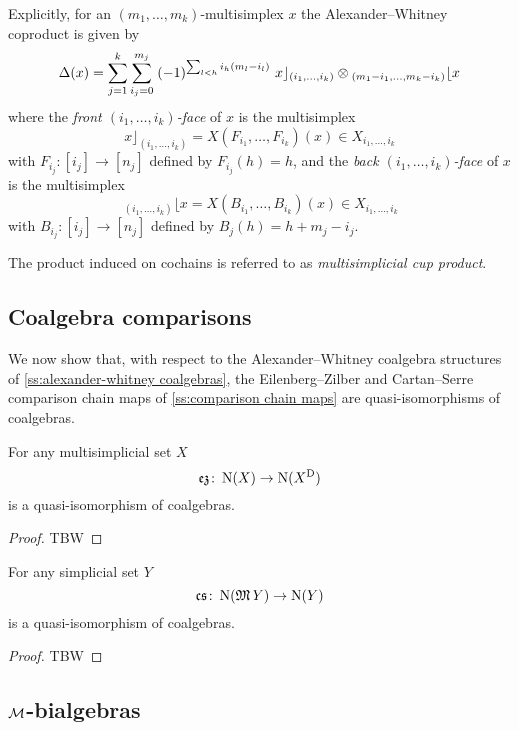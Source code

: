 Explicitly, for an $(m_1, \dots, m_k)$-multisimplex $x$ the Alexander--Whitney coproduct is given by
\[
\operatorname{\Delta}(x) =
\sum_{j=1}^k \sum_{i_{j}=0}^{m_{j}} \;
(-1)^{\sum_{l<h} i_h (m_l-i_l) } \
x \rfloor_{(i_{1},\dots,i_{k})} \otimes
\!\,_{(m_{1}-i_{1}, \dots, m_{k}-i_{k})} \lfloor x
\]
where the \textit{front $(i_1, \dots, i_k)$-face} of $x$ is the multisimplex
\[
x \rfloor_{(i_{1}, \dots, i_{k})} =
X(F_{i_1}, \dots, F_{i_k})(x) \in X_{i_1, \dots, i_k}
\]
with
$F_{i_j} \colon [i_j] \to [n_j]$ defined by $F_{i_j}(h)=h$, and the \textit{back $(i_1, \dots, i_k)$-face} of $x$ is the multisimplex
\[
\,_{(i_{1}, \dots, i_{k})} \lfloor x =
X(B_{i_1}, \dots, B_{i_k})(x) \in X_{i_1, \dots, i_k}
\]
with $B_{i_j} \colon [i_j] \to [n_j]$ defined by $B_j(h) = h+m_j-i_j$.

The product induced on cochains is referred to as \textit{multisimplicial cup product}.

\subsection{Coalgebra comparisons}

We now show that, with respect to the Alexander--Whitney coalgebra structures of \cref{ss:alexander-whitney coalgebras}, the Eilenberg--Zilber and Cartan--Serre comparison chain maps of \cref{ss:comparison chain maps} are quasi-isomorphisms of coalgebras.

\begin{theorem}
	For any multisimplicial set $X$
	\[
	\operatorname{\mathfrak{ez}} \colon \operatorname{N}(X) \to \operatorname{N}(X^{\mathrm{D}})
	\]
	is a quasi-isomorphism of coalgebras.
\end{theorem}

\begin{proof}
	TBW 
\end{proof}

\begin{theorem}
	For any simplicial set $Y$
	\[
	\operatorname{\mathfrak{cs}} \colon \operatorname{N}(\operatorname{\mathfrak{M}} Y) \to \operatorname{N}(Y)
	\]
	is a quasi-isomorphism of coalgebras.
\end{theorem}

\begin{proof}
	TBW 
\end{proof}

\subsection{$\mathcal{M}$-bialgebras}

